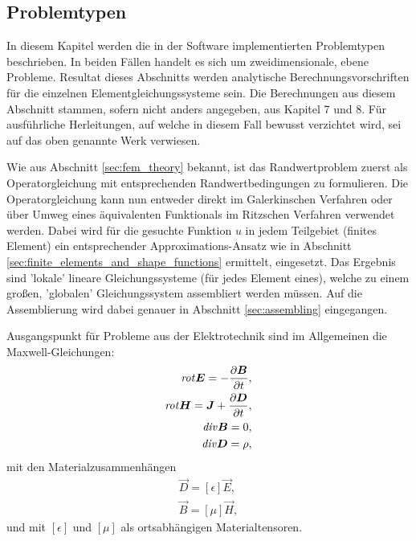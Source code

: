 \subsection{Problemtypen}
\label{sec:problem_types}
In diesem Kapitel werden die in der Software implementierten Problemtypen beschrieben. In beiden Fällen handelt es sich um zweidimensionale, ebene Probleme. Resultat dieses Abschnitts werden analytische Berechnungsvorschriften für die einzelnen Elementgleichungssysteme sein.\newline
Die Berechnungen aus diesem Abschnitt stammen, sofern nicht anders angegeben, aus \cite{SMS_VO_skript} Kapitel 7 und 8. Für ausführliche Herleitungen, auf welche in diesem Fall bewusst verzichtet wird, sei auf das oben genannte Werk verwiesen.\newline

Wie aus Abschnitt \ref{sec:fem_theory} bekannt, ist das Randwertproblem zuerst als Operatorgleichung mit entsprechenden Randwertbedingungen zu formulieren. Die Operatorgleichung kann nun entweder direkt im Galerkinschen Verfahren oder über Umweg eines äquivalenten Funktionals im Ritzschen Verfahren verwendet werden. Dabei wird für die gesuchte Funktion $u$ in jedem Teilgebiet (finites Element) ein entsprechender Approximations-Ansatz wie in Abschnitt \ref{sec:finite_elements_and_shape_functions} ermittelt, eingesetzt. Das Ergebnis sind 'lokale' lineare Gleichungssysteme (für jedes Element eines), welche zu einem großen, 'globalen' Gleichungssystem assembliert werden müssen. Auf die Assemblierung wird dabei genauer in Abschnitt \ref{sec:assembling} eingegangen.\newline

Ausgangspunkt für Probleme aus der Elektrotechnik sind im Allgemeinen die Maxwell-Gleichungen:
\begin{align}
	\mathit{rot}\boldsymbol{E} = -\frac{\partial \boldsymbol{B}}{\partial t} \label{eq:maxwell_1}, \\
	\mathit{rot}\boldsymbol{H} = \boldsymbol{J} + \frac{\partial \boldsymbol{D}}{\partial t} \label{eq:maxwell_2},\\
	\mathit{div}\boldsymbol{B} = 0 \label{eq:maxwell_3},\\
	\mathit{div}\boldsymbol{D} = \rho \label{eq:maxwell_4},
\end{align}
mit den Materialzusammenhängen
\begin{align}
\vec{D} = [\epsilon]\vec{E} \label{eq:material_1},\\
\vec{B} = [\mu]\vec{H} \label{eq:material_2},
\end{align}
und mit $[\epsilon]$ und $[\mu]$ als ortsabhängigen Materialtensoren.

